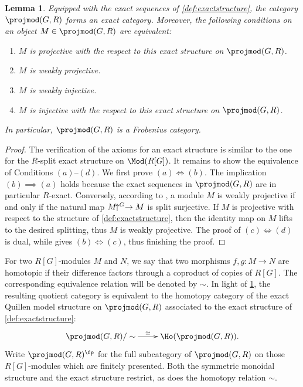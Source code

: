 \documentclass{amsart}%
\numberwithin{equation}{section}%
\newtheorem{Lem}[equation]{Lemma}
\theoremstyle{remark}
\newcounter{enum-resume-hack}
\begin{document}
\begin{Lem}\label{lem:exactstructure}
Equipped with the exact sequences of \cref{def:exactstructure}, the category $\projmod(G,R)$ forms an exact category. Moreover, the following conditions on an object $M \in \projmod(G,R)$ are equivalent:
    \begin{enumerate}
        \item $M$ is projective with the respect to this exact structure on $\projmod(G,R)$.
        \item $M$ is weakly projective.
        \item $M$ is weakly injective.
        \item $M$ is injective with the respect to this exact structure on $\projmod(G,R)$.
    \end{enumerate}
In particular, $\projmod(G,R)$ is a Frobenius category.
\end{Lem}
\begin{proof}
The verification of the axioms for an exact structure is similar to the one for the $R$-split exact structure on $\Mod(R[G])$. It remains to show the equivalence of Conditions $(a)$--$(d)$. We first prove $(a) \iff (b)$. The implication $(b) \implies (a)$ holds because the exact sequences in $\projmod(G,R)$ are in particular $R$-exact. Conversely, according to \cite[Thm.~2.6]{BensonIyengarKrause13}, a module $M$ is weakly projective if and only if the natural map $M\hspace{-1ex}\uparrow^G \to M$ is split surjective. If $M$ is projective with respect to the structure of \cref{def:exactstructure}, then the identity map on $M$ lifts to the desired splitting, thus $M$ is weakly projective. The proof of $(c) \iff (d)$ is dual, while \cite[Thm.~2.6]{BensonIyengarKrause13} gives $(b) \iff (c)$, thus finishing the proof. 
\end{proof}

For two $R[G]$-modules $M$ and $N$, we say that two morphisms $f,g\colon M \to N$ are homotopic if their difference factors through a coproduct of copies of $R[G]$. The corresponding equivalence relation will be denoted by $\sim$. In light of \cref{lem:exactstructure}, the resulting quotient category is equivalent to the homotopy category of the exact Quillen model structure on $\projmod(G,R)$ associated to the exact structure of \cref{def:exactstructure}:
\begin{equation}\label{eq:frobenius}
    \xymatrix{\projmod(G,R)/\sim \ar[r]^-{\simeq} & \Ho(\projmod(G,R)).}
\end{equation}
Write $\projmod(G,R)^{\fp}$ for the full subcategory of $\projmod(G,R)$ on those $R[G]$-modules which are finitely presented. Both the symmetric monoidal structure and the exact structure restrict, as does the homotopy relation $\sim$.
\end{document}
